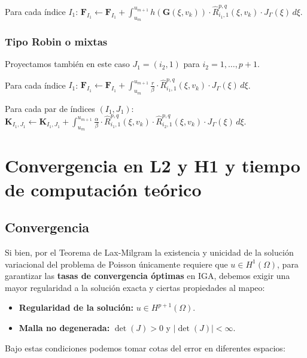 \documentclass[11pt]{book}
\theoremstyle{plain} %
\theoremstyle{definition} %
\theoremstyle{definition} %
\begin{document}
Para cada índice $I_1$: $\mathbf{F}_{I_1} \leftarrow \mathbf{F}_{I_1} + \int_{u_m}^{u_{m+1}} h(\mathbf{G}(\xi, v_k)) \cdot \hat{R}_{i_1,1}^{p,q}(\xi, v_k) \cdot J_{\Gamma}(\xi) \, d\xi.$



\subsubsection{Tipo Robin o mixtas}

Proyectamos también en este caso $J_1 = (i_2, 1)$ para $i_2=1,\dots,p+1$.

Para cada índice $I_1$: $\mathbf{F}_{I_1} \leftarrow \mathbf{F}_{I_1} + \int_{u_m}^{u_{m+1}} \frac{r}{\beta} \cdot \hat{R}_{i_1,1}^{p,q}(\xi, v_k) \cdot J_{\Gamma}(\xi) \, d\xi$.

Para cada par de índices $(I_1, J_1)$: $\mathbf{K}_{I_1,J_1} \leftarrow \mathbf{K}_{I_1,J_1} + \int_{u_m}^{u_{m+1}} \frac{\alpha}{\beta} \cdot \hat{R}_{i_1,1}^{p,q}(\xi, v_k) \cdot \hat{R}_{i_2,1}^{p,q}(\xi, v_k) \cdot J_{\Gamma}(\xi) \, d\xi$.




\section{Convergencia en L2 y H1 y tiempo de computación teórico}

\subsection{Convergencia}\label{sec:convergencia}

Si bien, por el Teorema de Lax-Milgram la existencia y unicidad de la solución variacional del problema de Poisson únicamente requiere que $u \in H^1(\Omega)$, para garantizar las \textbf{tasas de convergencia óptimas} en IGA, debemos exigir una mayor regularidad a la solución exacta y ciertas propiedades al mapeo:

\begin{itemize}
    \item \textbf{Regularidad de la solución:} $u\in H^{p+1}(\Omega)$.
    \item \textbf{Malla no degenerada:} $\det(J)>0$ y $|\det(J)|$$<\infty$.
\end{itemize}

Bajo estas condiciones podemos tomar cotas del error en diferentes espacios:
\end{document}
